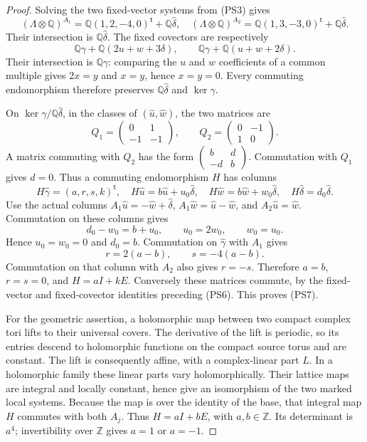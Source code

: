 \begin{proof}
Solving the two fixed-vector systems from (PS3) gives
\[
 (\Lambda\otimes\mathbb Q)^{A_1}
   =\mathbb Q(1,2,-4,0)^{\mathsf t}+\mathbb Q\widehat\delta,
 \quad
 (\Lambda\otimes\mathbb Q)^{A_2}
   =\mathbb Q(1,3,-3,0)^{\mathsf t}+\mathbb Q\widehat\delta.
\]
Their intersection is $\mathbb Q\widehat\delta$. The fixed covectors
are respectively
\[
 \mathbb Q\gamma+\mathbb Q(2u+w+3\delta),\qquad
 \mathbb Q\gamma+\mathbb Q(u+w+2\delta).
\]
Their intersection is $\mathbb Q\gamma$: comparing the $u$ and $w$
coefficients of a common multiple gives $2x=y$ and $x=y$, hence
$x=y=0$. Every commuting endomorphism therefore preserves
$\mathbb Q\widehat\delta$ and $\ker\gamma$.

On $\ker\gamma/\mathbb Q\widehat\delta$, in the classes of
$(\widehat u,\widehat w)$, the two matrices are
\[
 Q_1=\begin{pmatrix}0&1\\-1&-1\end{pmatrix},\qquad
 Q_2=\begin{pmatrix}0&-1\\1&0\end{pmatrix}.
\]
A matrix commuting with $Q_2$ has the form
$\left(\begin{smallmatrix}b&d\\-d&b\end{smallmatrix}\right)$.
Commutation with $Q_1$ gives $d=0$. Thus a commuting endomorphism $H$
has columns
\[
 H\widehat\gamma=(a,r,s,k)^{\mathsf t},\quad
 H\widehat u=b\widehat u+u_0\widehat\delta,\quad
 H\widehat w=b\widehat w+w_0\widehat\delta,\quad
 H\widehat\delta=d_0\widehat\delta.
\]
Use the actual columns $A_1\widehat u=-\widehat w+\widehat\delta$,
$A_1\widehat w=\widehat u-\widehat w$, and
$A_2\widehat u=\widehat w$. Commutation on these columns gives
\[
 d_0-w_0=b+u_0,\qquad u_0=2w_0,\qquad w_0=u_0.
\]
Hence $u_0=w_0=0$ and $d_0=b$. Commutation on
$\widehat\gamma$ with $A_1$ gives
\[
 r=2(a-b),\qquad s=-4(a-b).
\]
Commutation on that column with $A_2$ also gives $r=-s$.
Therefore $a=b$, $r=s=0$, and $H=aI+kE$. Conversely these matrices
commute, by the fixed-vector and fixed-covector identities preceding
(PS6). This proves (PS7).

For the geometric assertion, a holomorphic map between two compact
complex tori lifts to their universal covers. The derivative of the
lift is periodic, so its entries descend to holomorphic functions on
the compact source torus and are constant. The lift is consequently
affine, with a complex-linear part $L$. In a holomorphic family these
linear parts vary holomorphically. Their lattice maps are integral
and locally constant, hence give an isomorphism of the two marked
local systems. Because the map is over the identity of the base,
that integral map $H$ commutes with both $A_j$. Thus
$H=aI+bE$, with $a,b\in\mathbb Z$. Its determinant is $a^4$;
invertibility over $\mathbb Z$ gives $a=1$ or $a=-1$.


\end{proof}
